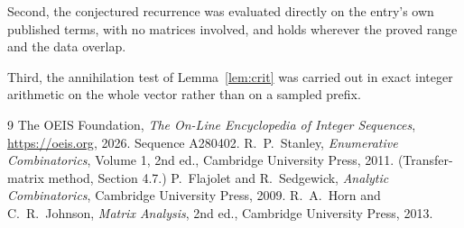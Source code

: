 \documentclass[11pt,a4paper]{article}
\theoremstyle{plain}
\theoremstyle{definition}
\begin{document}
Second, the conjectured recurrence was evaluated directly on the entry's own published terms,
with no matrices involved, and holds wherever the proved range and the data overlap.

Third, the annihilation test of Lemma~\ref{lem:crit} was carried out in exact integer
arithmetic on the whole vector rather than on a sampled prefix.

\begin{thebibliography}{9}
 The OEIS Foundation, \emph{The On-Line Encyclopedia of Integer
Sequences}, \url{https://oeis.org}, 2026. Sequence A280402.
 R.~P.~Stanley, \emph{Enumerative Combinatorics}, Volume 1, 2nd ed.,
Cambridge University Press, 2011. (Transfer-matrix method, Section 4.7.)
 P.~Flajolet and R.~Sedgewick, \emph{Analytic Combinatorics}, Cambridge
University Press, 2009.
 R.~A.~Horn and C.~R.~Johnson, \emph{Matrix Analysis}, 2nd ed., Cambridge
University Press, 2013.
\end{thebibliography}
\end{document}
